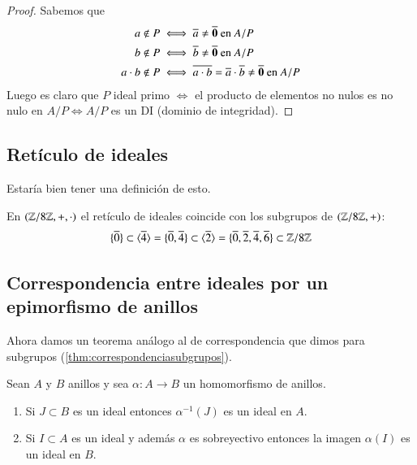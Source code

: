 \begin{proof}
	Sabemos que
	\begin{align*}
	a \notin P &\iff \overline{a} \neq \overline{\mathbf{0}} \text{ en } A/P \\
	b \notin P &\iff \overline{b} \neq \overline{\mathbf{0}} \text{ en } A/P \\
	a\cdot b \notin P &\iff \overline{a\cdot b} = \overline{a}\cdot \overline{b} \neq \overline{\mathbf{0}} \text{ en } A/P
	\end{align*}
	Luego es claro que $P$ ideal primo $\iff$ el producto de elementos no nulos es no nulo en $A/P \iff A/P$ es un DI (dominio de integridad).
\end{proof}


\subsection{Retículo de ideales}

\begin{dfn}
	Estaría bien tener una definición de esto.
\end{dfn}


\begin{ej}
	En $(\mathbb{Z}/8\mathbb{Z}, +, \cdot)$ el retículo de ideales coincide con los subgrupos de $(\mathbb{Z}/8\mathbb{Z}, +)$:
	\begin{align*}
	\{\overline{0}\} \subset \langle\overline{4}\rangle = \{\overline{0}, \overline{4}\} \subset \langle\overline{2}\rangle = \{\overline{0}, \overline{2}, \overline{4}, \overline{6}\} \subset \mathbb{Z}/8\mathbb{Z}
	\end{align*}
\end{ej}

\subsection{Correspondencia entre ideales por un epimorfismo de anillos}

Ahora damos un teorema análogo al de correspondencia que dimos para subgrupos (\autoref{thm:correspondenciasubgrupos}).

\begin{thm}
	Sean $A$ y $B$ anillos y sea $\alpha: A \to B$ un homomorfismo de anillos.
	\begin{enumerate}
		\item Si $J \subset B$ es un ideal entonces $\alpha^{-1}(J)$ es un ideal en $A$.
		\item Si $I \subset A$ es un ideal y además $\alpha$ es sobreyectivo entonces la imagen $\alpha(I)$ es un ideal en $B$.
	\end{enumerate}
\end{thm}

